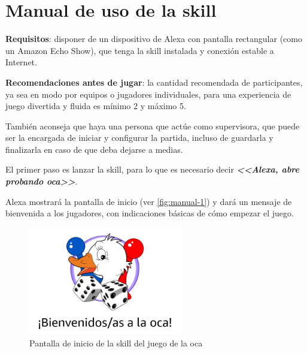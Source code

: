 \section{Manual de uso de la skill}


\textbf{Requisitos}: disponer de un dispositivo de Alexa con pantalla rectangular (como un Amazon Echo Show), que tenga la skill instalada y conexión estable a Internet.

\vspace{0.5cm}

\textbf{Recomendaciones antes de jugar}: la cantidad recomendada de participantes, ya sea en modo por equipos o jugadores individuales, para una experiencia de juego divertida y fluida es mínimo 2 y máximo 5. 

También aconseja que haya una persona que actúe como supervisora, que puede ser la encargada de iniciar y configurar la partida, incluso de guardarla y finalizarla en caso de que deba dejarse a medias.

\vspace{0.5cm}

El primer paso es lanzar la skill, para lo que es necesario decir \textbf{\textit{<<Alexa, abre probando oca>>}}.

Alexa mostrará la pantalla de inicio (ver \autoref{fig:manual-1}) y dará un mensaje de bienvenida a los jugadores, con indicaciones básicas de cómo empezar el juego.

\begin{figure}[H]
	\centering
	\includegraphics[width=0.6\textwidth]{imgs/interfaz-1.JPG}
	\caption{Pantalla de inicio de la skill del juego de la oca}
	\label{fig:manual-1}
\end{figure}

